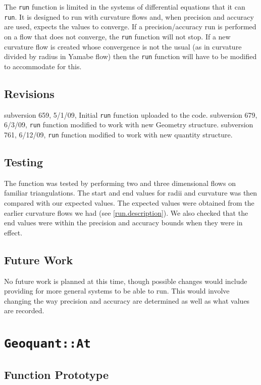 \documentclass[12pt]{article}%
\begin{document}
The \texttt{run} function is limited in the systems of differential equations that it can \texttt{run}. It is designed to run with curvature flows and, when precision and accuracy are used, expects the values to converge. If a precision/accuracy run is performed on a flow that does not converge, the \texttt{run} function will not stop. If a new curvature flow is created whose convergence is not the usual (as in curvature divided by radius in Yamabe flow) then the \texttt{run} function will have to be modified to accommodate for this.  \ 

\subsection*{Revisions}

subversion 659, 5/1/09, Initial \texttt{run} function uploaded to the code.
subversion 679, 6/3/09, \texttt{run} function modified to work with new Geometry structure.
subversion 761, 6/12/09, \texttt{run} function modified to work with new quantity structure.

\subsection*{Testing}

The function was tested by performing two and three dimensional flows on familiar triangulations. The start and end values for radii and curvature was then compared with our expected values. The expected values were obtained from the earlier curvature flows we had (see \ref{run.description}). We also checked that the end values were within the precision and accuracy bounds when they were in effect.  \ 

\subsection*{Future Work}

No future work is planned at this time, though possible changes would include providing for more general systems to be able to run. This would involve changing the way precision and accuracy are determined as well as what values are recorded. \	

\section*{\texttt{Geoquant::\texttt{At}}}

\subsection*{Function Prototype}
\end{document}
